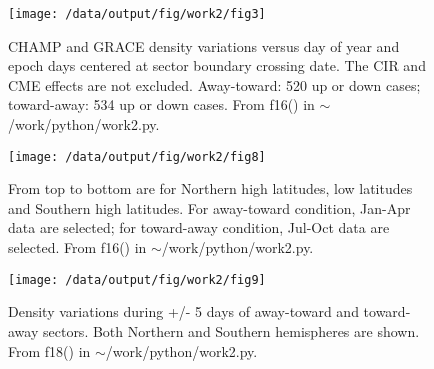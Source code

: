 \documentclass[12pt,a4paper]{article}
\begin{document}
\begin{figure}[!ht]
    \begin{center}
        \texttt{[image: /data/output/fig/work2/fig3]}
        \caption{CHAMP and GRACE density variations versus day of year and epoch days centered at sector boundary crossing date. The CIR and CME effects are not excluded. Away-toward: 520 up or down cases; toward-away: 534 up or down cases. From f16() in $\sim$/work/python/work2.py. }
    \end{center}
    \label{fig3}
\end{figure}

\begin{figure}[!ht]
    \begin{center}
        \texttt{[image: /data/output/fig/work2/fig8]}
        \caption{From top to bottom are for Northern high latitudes, low latitudes and Southern high latitudes. For away-toward condition, Jan-Apr data are selected; for toward-away condition, Jul-Oct data are selected. From f16() in $\sim$/work/python/work2.py.}
    \end{center}
    \label{fig8}
\end{figure}

\begin{figure}[!ht]
    \begin{center}
        \texttt{[image: /data/output/fig/work2/fig9]}
        \caption{Density variations during +/- 5 days of away-toward and toward-away sectors. Both Northern and Southern hemispheres are shown. From f18() in $\sim$/work/python/work2.py.}
    \end{center}
    \label{fig9}
\end{figure}
\end{document}
